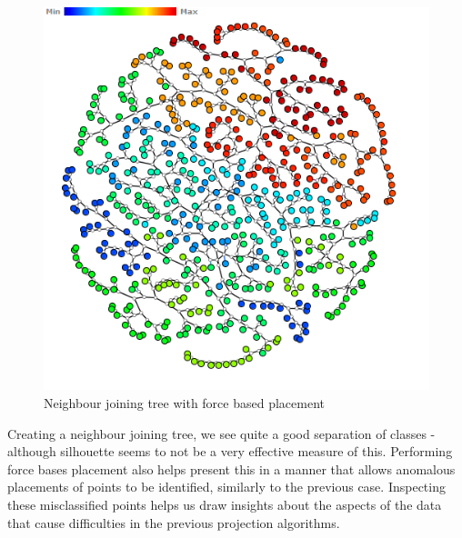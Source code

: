 \documentclass[ 10pt ]{fphw}
\begin{document}
\begin{center}
\begin{figure}[H]
    \centering
	\includegraphics[width=0.65\columnwidth]{task2d/medNJFB.PNG}
	\caption{Neighbour joining tree with force based placement}
	\label{fig:medNJFB}
	\end{figure}
\end{center}

Creating a neighbour joining tree, we see quite a good separation of classes - although silhouette seems to not be a very effective measure of this. Performing force bases placement also helps present this in a manner that allows anomalous placements of points to be identified, similarly to the previous case. Inspecting these misclassified points helps us draw insights about the aspects of the data that cause difficulties in the previous projection algorithms.
\end{document}
